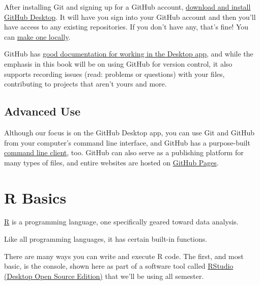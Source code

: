 \documentclass[
  letterpaper,
  DIV=11,
  numbers=noendperiod]{scrreprt}
\begin{document}
After installing Git and signing up for a GitHub account,
\href{https://docs.github.com/en/desktop/installing-and-configuring-github-desktop}{download
and install GitHub Desktop}. It will have you sign into your GitHub
account and then you'll have access to any existing repositories. If you
don't have any, that's fine! You can
\href{https://docs.github.com/en/desktop/installing-and-configuring-github-desktop/overview/creating-your-first-repository-using-github-desktop}{make
one locally}.

GitHub has
\href{https://docs.github.com/en/desktop/contributing-and-collaborating-using-github-desktop}{good
documentation for working in the Desktop app}, and while the emphasis in
this book will be on using GitHub for version control, it also supports
recording issues (read: problems or questions) with your files,
contributing to projects that aren't yours and more.

\hypertarget{advanced-use}{%
\section{Advanced Use}\label{advanced-use}}

Although our focus is on the GitHub Desktop app, you can use Git and
GitHub from your computer's command line interface, and GitHub has a
purpose-built \href{https://docs.github.com/en/github-cli}{command line
client}, too. GitHub can also serve as a publishing platform for many
types of files, and entire websites are hosted on
\href{https://docs.github.com/en/pages}{GitHub Pages}.


\hypertarget{r-basics}{%
\chapter{R Basics}\label{r-basics}}

\href{https://www.r-project.org/about.html}{R} is a programming
language, one specifically geared toward data analysis.

Like all programming languages, it has certain built-in functions.

There are many ways you can write and execute R code. The first, and
most basic, is the console, shown here as part of a software tool called
\href{https://www.rstudio.com/products/rstudio/}{RStudio (Desktop Open
Source Edition)} that we'll be using all semester.
\end{document}
